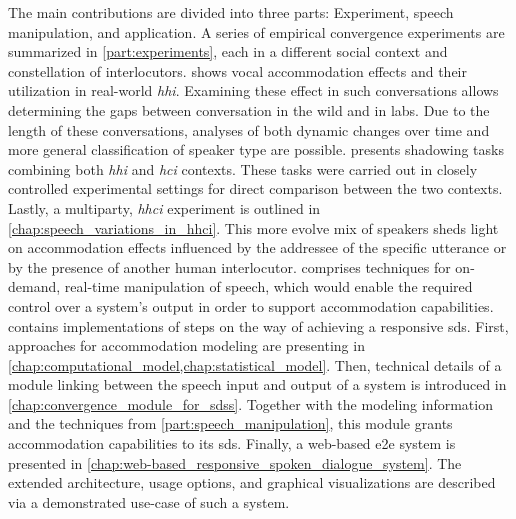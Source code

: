 The main contributions are divided into three parts: Experiment, speech manipulation, and application.
A series of empirical convergence experiments are summarized in \cref{part:experiments}, each in a different social context and constellation of interlocutors.
 shows vocal accommodation effects and their utilization in real-world \emph{\acl{hhi}}.
Examining these effect in such conversations  allows determining the gaps between conversation in the wild and in labs.
Due to the length of these conversations, analyses of both dynamic changes over time and more general classification of speaker type are possible.
 presents shadowing tasks combining both \emph{\acl{hhi}} and \emph{\acl{hci}} contexts.
These tasks were carried out in closely controlled experimental settings for direct comparison between the two contexts.
Lastly, a multiparty, \emph{\acl{hhci}} experiment is outlined in \cref{chap:speech_variations_in_hhci}.
This more evolve mix of speakers sheds light on accommodation effects influenced by the addressee of the specific utterance or by the presence of another human interlocutor.
 comprises techniques for on-demand, real-time manipulation of speech, which would enable the required control over a system's output in order to support accommodation capabilities.
\noindent{} contains implementations of steps on the way of achieving a responsive \acl{sds}.
First, approaches for accommodation modeling are presenting in \cref{chap:computational_model,chap:statistical_model}.
Then, technical details of a module linking between the speech input and output of a system is introduced in \cref{chap:convergence_module_for_sdss}.
Together with the modeling information and the techniques from \cref{part:speech_manipulation}, this module grants accommodation capabilities to its \acl{sds}.
Finally, a web-based \acl{e2e} system is presented in \cref{chap:web-based_responsive_spoken_dialogue_system}.
The extended architecture, usage options, and  graphical visualizations are described via a demonstrated use-case of such a system.

\pagestyle{fancy}
\fancyhead{}
\fancyhead[LO]{\leftmark}
\fancyhead[RE]{\rightmark}

